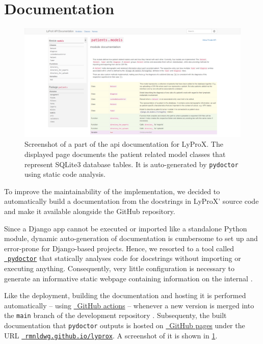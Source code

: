 \documentclass[\relativeRoot/main.tex]{subfiles}
\begin{document}
\section{Documentation}
\label{sec:lyprox:documentation}

\begin{figure}
    \centering
    \includegraphics[width=\textwidth, frame]{figures/docs.png}
    \caption[
        Documentation for LyProX
    ]{
        Screenshot of a part of the \acrshort{api} documentation for LyProX. The displayed page documents the patient related model classes that represent SQLite3 database tables. It is auto-generated by \texttt{pydoctor} \cite{hudson_pydoctor_2022} using static code analysis.
    }
    \label{fig:lyprox:documentation}
\end{figure}

To improve the maintainability of the implementation, we decided to automatically build a documentation from the docstrings in LyProX' source code and make it available alongside the GitHub repository.

Since a Django app cannot be executed or imported like a standalone Python module, dynamic auto-generation of documentation is cumbersome to set up and error-prone for Django-based projects. Hence, we resorted to a tool called \href{https://pydoctor.readthedocs.io/en/latest/}{~\texttt{pydoctor}} \cite{hudson_pydoctor_2022} that statically analyses code for docstrings without importing or executing anything. Consequently, very little configuration is necessary to generate an informative static webpage containing information on the internal .

Like the deployment, building the documentation and hosting it is performed automatically -- using \href{https://github.com/features/actions}{~GitHub actions} -- whenever a new version is merged into the \texttt{main} branch of the development repository . Subsequenty, the built documentation that \texttt{pydoctor} outputs is hosted on \href{https://pages.github.com/}{~GitHub pages} under the URL \href{https://rmnldwg.github.io/lyprox}{~\texttt{rmnldwg.github.io/lyprox}}. A screenshot of it is shown in \cref{fig:lyprox:documentation}.
\end{document}
